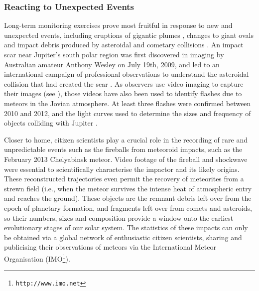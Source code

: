 \documentclass{ar2e}
\begin{document}





\subsubsection{Reacting to Unexpected Events}


Long-term monitoring exercises prove most fruitful in response to new and
unexpected events, including eruptions of gigantic plumes \citep{08sanchez,
11fletcher}, changes to giant ovals \citep{06simon-miller} and impact debris
produced by asteroidal and cometary collisions \citep{10hammel}.  An impact
scar near Jupiter's south polar region was first discovered in imaging by
Australian amateur Anthony Wesley on July 19th, 2009, and led to an
international campaign of professional observations to understand the
asteroidal collision that had created the scar
\citep[e.g.,][]{10depater,11orton}.  As observers use video imaging to capture
their images (see \Sref{}), those videos have also been used to
identify flashes due to meteors in the Jovian atmosphere.  At least three
flashes were confirmed between 2010 and 2012, and the light curves used to
determine the sizes and frequency of objects colliding with Jupiter
\citep[e.g.,][]{10hueso}. 

Closer to home, citizen scientists play a crucial role in the recording of rare
and unpredictable events such as the fireballs from meteoroid impacts, such as
the February 2013 Chelyabinsk meteor.  Video footage of the fireball and
shockwave were essential to scientifically characterise the impactor and its
likely origins.   These
reconstructed trajectories even permit the recovery of meteorites from a strewn
field (i.e., when the meteor survives the intense heat of atmospheric entry and
reaches the ground).  These objects are the remnant debris left over from the
epoch of planetary formation, and fragments left over from comets and asteroids,
so their numbers, sizes and composition provide a window onto the earliest
evolutionary stages of our solar system.  The statistics of these impacts can
only be obtained via a global network of enthusiastic citizen scientists,
sharing and publicising their observations of meteors via the International
Meteor Organisation (IMO\footnote{\texttt{http://www.imo.net}}).  
\end{document}
